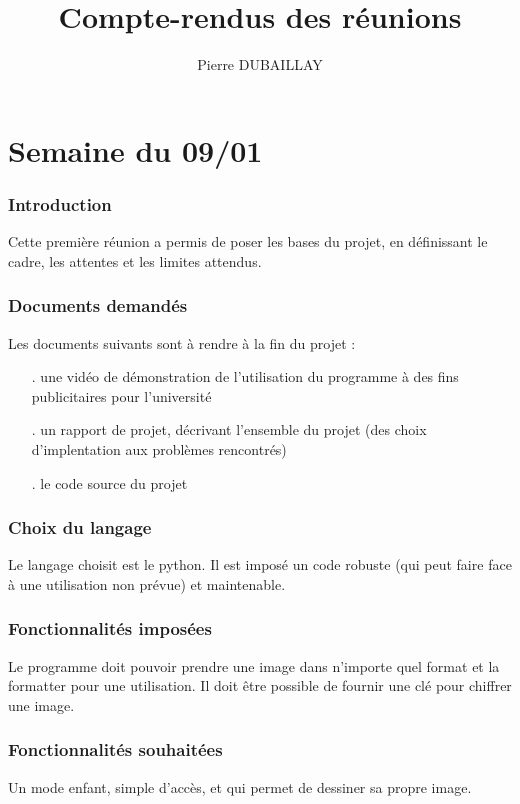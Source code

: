 \documentclass{report}
\title{Compte-rendus des réunions}
\author{Pierre DUBAILLAY}
\begin{document}
\maketitle

\part*{Semaine du 09/01}
\section*{Introduction}
Cette première réunion a permis de poser les bases du projet, en définissant le cadre, les attentes et les limites attendus.

\section*{Documents demandés}
Les documents suivants sont à rendre à la fin du projet :
\begin{itemize}
	\item[.] une vidéo de démonstration de l'utilisation du programme à des fins publicitaires pour l'université
	\item[.] un rapport de projet, décrivant l'ensemble du projet (des choix d'implentation aux problèmes rencontrés)
	\item[.] le code source du projet
\end{itemize}

\section*{Choix du langage}
Le langage choisit est le python. Il est imposé un code robuste (qui peut faire face à une utilisation non prévue) et maintenable.

\section*{Fonctionnalités imposées}
Le programme doit pouvoir prendre une image dans n'importe quel format et la formatter pour une utilisation. Il doit être possible de fournir une clé pour chiffrer une image.

\section*{Fonctionnalités souhaitées}
Un mode enfant, simple d'accès, et qui permet de dessiner sa propre image.
\end{document}
